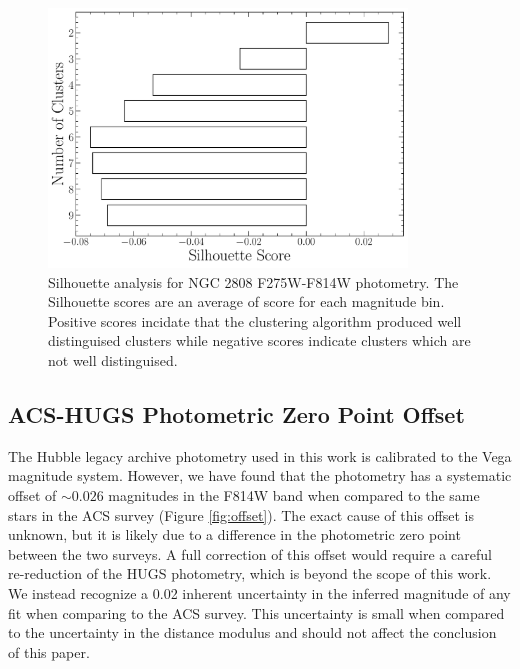 \begin{figure}
  \centering
  \includegraphics[width=0.85\textwidth]{figures/ngc2808/ClusterAnalysis.pdf}
  \caption{Silhouette analysis for NGC 2808 F275W-F814W photometry. The Silhouette scores
  are an average of score for each magnitude bin. Positive scores incidate that the clustering
  algorithm produced well distinguised clusters while negative scores indicate clusters which are not
  well distinguised.}
  \label{fig:clusterAn}
\end{figure}


\subsection{ACS-HUGS Photometric Zero Point Offset}
The Hubble legacy archive photometry used in this work is calibrated to the
Vega magnitude system. However, we have found that the photometry has a
systematic offset of $\sim0.026$ magnitudes in the F814W band when
compared to the same stars in the ACS survey (Figure \ref{fig:offset}). The
exact cause of this offset is unknown, but it is likely due to a difference in
the photometric zero point between the two surveys. A full correction of this
offset would require a careful re-reduction of the HUGS photometry, which is
beyond the scope of this work. We instead recognize a 0.02 inherent uncertainty
in the inferred magnitude of any fit when comparing to the ACS survey. This
uncertainty is small when compared to the uncertainty in the
distance modulus and should not affect the conclusion of this
paper. 

